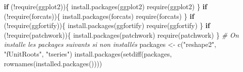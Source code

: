\documentclass[
  11pt,
]{article}
\newenvironment{Shaded}{\begin{snugshade}}{\end{snugshade}}
\newcommand{\CommentTok}[1]{\textcolor[rgb]{0.56,0.35,0.01}{\textit{#1}}}
\newcommand{\ControlFlowTok}[1]{\textcolor[rgb]{0.13,0.29,0.53}{\textbf{#1}}}
\newcommand{\FunctionTok}[1]{\textcolor[rgb]{0.00,0.00,0.00}{#1}}
\newcommand{\NormalTok}[1]{#1}
\newcommand{\OtherTok}[1]{\textcolor[rgb]{0.56,0.35,0.01}{#1}}
\newcommand{\SpecialCharTok}[1]{\textcolor[rgb]{0.00,0.00,0.00}{#1}}
\newcommand{\StringTok}[1]{\textcolor[rgb]{0.31,0.60,0.02}{#1}}
\begin{document}
\begin{Shaded}
\begin{Highlighting}[]
\ControlFlowTok{if}\NormalTok{ (}\SpecialCharTok{!}\FunctionTok{require}\NormalTok{(ggplot2))\{}
    \FunctionTok{install.packages}\NormalTok{(ggplot2)}
    \FunctionTok{require}\NormalTok{(ggplot2)}
\NormalTok{\}}
\ControlFlowTok{if}\NormalTok{ (}\SpecialCharTok{!}\FunctionTok{require}\NormalTok{(forcats))\{}
    \FunctionTok{install.packages}\NormalTok{(forcats)}
    \FunctionTok{require}\NormalTok{(forcats)}
\NormalTok{\}}
\ControlFlowTok{if}\NormalTok{ (}\SpecialCharTok{!}\FunctionTok{require}\NormalTok{(ggfortify))\{}
    \FunctionTok{install.packages}\NormalTok{(ggfortify)}
    \FunctionTok{require}\NormalTok{(ggfortify)}
\NormalTok{\}}
\ControlFlowTok{if}\NormalTok{ (}\SpecialCharTok{!}\FunctionTok{require}\NormalTok{(patchwork))\{}
    \FunctionTok{install.packages}\NormalTok{(patchwork)}
    \FunctionTok{require}\NormalTok{(patchwork)}
\NormalTok{\}}
\CommentTok{\# On installe les packages suivants si non installés}
\NormalTok{packages }\OtherTok{\textless{}{-}} \FunctionTok{c}\NormalTok{(}\StringTok{"reshape2"}\NormalTok{, }\StringTok{"fUnitRoots"}\NormalTok{, }\StringTok{"tseries"}\NormalTok{)}
\FunctionTok{install.packages}\NormalTok{(}\FunctionTok{setdiff}\NormalTok{(packages, }\FunctionTok{rownames}\NormalTok{(}\FunctionTok{installed.packages}\NormalTok{())))  }


\end{Highlighting}
\end{Shaded}
\end{document}
